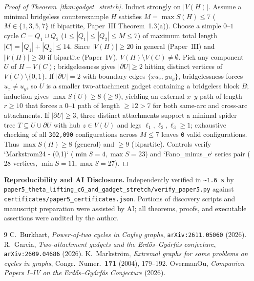 \documentclass[11pt]{amsart}
\theoremstyle{remark}
\begin{document}
\begin{proof}[Proof of Theorem~\ref{thm:gadget_stretch}]
Induct strongly on $|V(H)|$. Assume a minimal bridgeless counterexample $H$ satisfies $M = \max S(H) \le 7$ ($M \in \{1, 3, 5, 7\}$ if bipartite, Paper~III Theorem~1.3(a)). Choose a simple $0$--$1$ cycle $C = Q_1 \cup Q_2$ ($1 \le |Q_1| \le |Q_2| \le M \le 7$) of maximum total length $|C| = |Q_1| + |Q_2| \le 14$. Since $|V(H)| \ge 20$ in general (Paper~III) and $|V(H)| \ge 30$ if bipartite (Paper~IV), $V(H) \setminus V(C) \ne \emptyset$. Pick any component $U$ of $H - V(C)$; bridgelessness gives $|\partial U| \ge 2$ hitting distinct vertices of $V(C) \setminus \{0, 1\}$. If $|\partial U| = 2$ with boundary edges $\{x u_x, y u_y\}$, bridgelessness forces $u_x \ne u_y$, so $U$ is a smaller two-attachment gadget containing a bridgeless block $B$; induction gives $\max S(U) \ge 8$ ($\ge 9$), yielding an external $x$--$y$ path of length $r \ge 10$ that forces a $0$--$1$ path of length $\ge 12 > 7$ for both same-arc and cross-arc attachments. If $|\partial U| \ge 3$, three distinct attachments support a minimal spider tree $T \subseteq U \cup \partial U$ with hub $z \in V(U)$ and legs $\ell_1, \ell_2, \ell_3 \ge 1$; exhaustive checking of all \texttt{302,090} configurations across $M \le 7$ leaves \texttt{0} valid configurations. Thus $\max S(H) \ge 8$ (general) and $\ge 9$ (bipartite). Controls verify `Markstrom24 - (0,1)` ($\min S = 4, \max S = 23$) and `Fano_minus_e` series pair ($28$ vertices, $\min S = 11, \max S = 27$).
\end{proof}

\noindent\textbf{Reproducibility and AI Disclosure.} Independently verified in \texttt{\~{}1.6\,s} by \texttt{paper5\_theta\_lifting\_c6\_and\_gadget\_stretch/verify\_paper5.py} against \texttt{certificates/paper5\_certificates.json}. Portions of discovery scripts and manuscript preparation were assisted by AI; all theorems, proofs, and executable assertions were audited by the author.

\begin{thebibliography}{9}
 C.~Burkhart, \emph{Power-of-two cycles in Cayley graphs}, \texttt{arXiv:2611.05060} (2026).
 R.~Garcia, \emph{Two-attachment gadgets and the Erd\H{o}s--Gy\'arf\'as conjecture}, \texttt{arXiv:2609.04686} (2026).
 K.~Markstr\"om, \emph{Extremal graphs for some problems on cycles in graphs}, Congr.\ Numer.\ \textbf{171} (2004), 179--192.
 OvermanOu, \emph{Companion Papers I--IV on the Erd\H{o}s--Gy\'arf\'as Conjecture} (2026).
\end{thebibliography}
\end{document}
